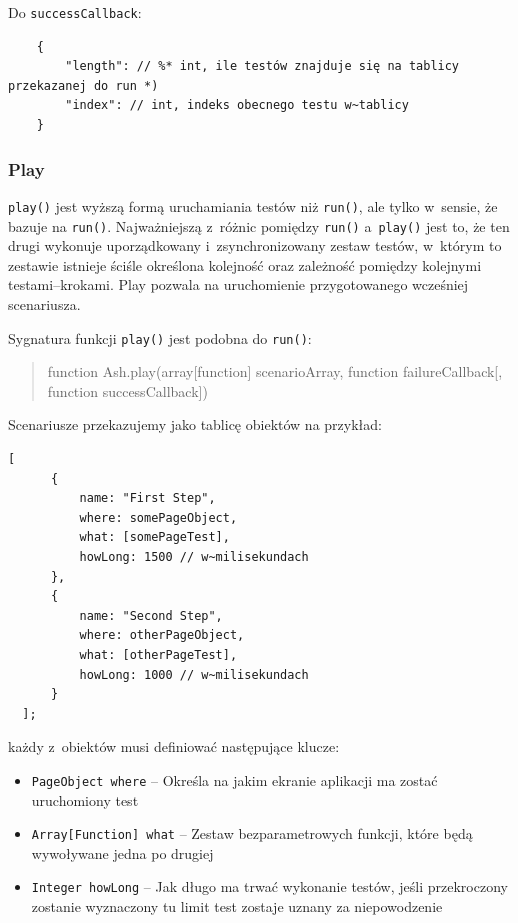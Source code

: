 \documentclass[brudnopis]{xmgr}
\begin{document}
Do \texttt{successCallback}: 

\begin{lstlisting}
	{
		"length": // %* int, ile testów znajduje się na tablicy przekazanej do run *) 
		"index": // int, indeks obecnego testu w~tablicy 
	}
\end{lstlisting}

\subsubsection{Play} 

\texttt{play()} jest wyższą formą uruchamiania testów niż \texttt{run()}, ale tylko w~sensie, że bazuje na \texttt{run()}. Najważniejszą z~różnic pomiędzy \texttt{run()} a~\texttt{play()} jest to, że ten drugi wykonuje uporządkowany i~zsynchronizowany zestaw testów, w~którym to zestawie istnieje ściśle określona kolejność oraz zależność pomiędzy kolejnymi testami--krokami. Play pozwala na uruchomienie przygotowanego wcześniej scenariusza. 

Sygnatura funkcji \texttt{play()} jest podobna do \texttt{run()}:

\begin{quote}
function Ash.play(array[function] scenarioArray, function failureCallback[, function successCallback]) 
\end{quote}

Scenariusze przekazujemy jako tablicę obiektów na przykład:

\begin{lstlisting}
[
      {
          name: "First Step",
          where: somePageObject,
          what: [somePageTest],
          howLong: 1500	// w~milisekundach
      },
      {
          name: "Second Step",
          where: otherPageObject,
          what: [otherPageTest],
          howLong: 1000	// w~milisekundach
      }
  ];
\end{lstlisting}

każdy z~obiektów musi definiować następujące klucze:

\begin{itemize}
  \item \texttt{PageObject where} -- Określa na jakim ekranie aplikacji ma zostać uruchomiony test
  \item \texttt{Array[Function] what} -- Zestaw bezparametrowych funkcji, które będą wywoływane jedna po drugiej 
  \item \texttt{Integer howLong} -- Jak długo ma trwać wykonanie testów, jeśli przekroczony zostanie wyznaczony tu limit test zostaje uznany za niepowodzenie 
\end{itemize}
\end{document}
